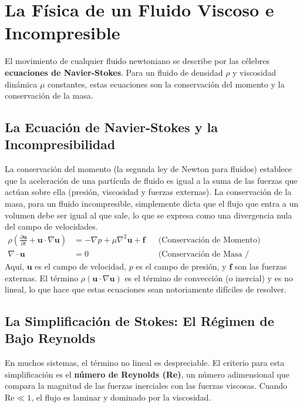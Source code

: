 \section{La Física de un Fluido Viscoso e Incompresible}
\label{sec:stokes-theory}
El movimiento de cualquier fluido newtoniano se describe por las célebres \textbf{ecuaciones de Navier-Stokes}. Para un fluido de densidad \(\rho\) y viscosidad dinámica \(\mu\) constantes, estas ecuaciones son la conservación del momento y la conservación de la masa.

\subsection{La Ecuación de Navier-Stokes y la Incompresibilidad}
La conservación del momento (la segunda ley de Newton para fluidos) establece que la aceleración de una partícula de fluido es igual a la suma de las fuerzas que actúan sobre ella (presión, viscosidad y fuerzas externas). La conservación de la masa, para un fluido incompresible, simplemente dicta que el flujo que entra a un volumen debe ser igual al que sale, lo que se expresa como una divergencia nula del campo de velocidades.
\begin{align}
    \rho \left( \frac{\partial\bm{u}}{\partial t} + \bm{u} \cdot \nabla\bm{u} \right) &= -\nabla p + \mu \nabla^2\bm{u} + \bm{f} && \text{(Conservación de Momento)} \label{eq:navier-stokes} \\
    \nabla \cdot \bm{u} &= 0 && \text{(Conservación de Masa / Incompresibilidad)} \label{eq:incompressibility}
\end{align}
Aquí, \(\bm{u}\) es el campo de velocidad, \(p\) es el campo de presión, y \(\bm{f}\) son las fuerzas externas. El término \(\rho(\bm{u} \cdot \nabla\bm{u})\) es el término de convección (o inercial) y es no lineal, lo que hace que estas ecuaciones sean notoriamente difíciles de resolver.

\subsection{La Simplificación de Stokes: El Régimen de Bajo Reynolds}
En muchos sistemas, el término no lineal es despreciable. El criterio para esta simplificación es el \textbf{número de Reynolds (Re)}, un número adimensional que compara la magnitud de las fuerzas inerciales con las fuerzas viscosas. Cuando \(\text{Re} \ll 1\), el flujo es laminar y dominado por la viscosidad.

